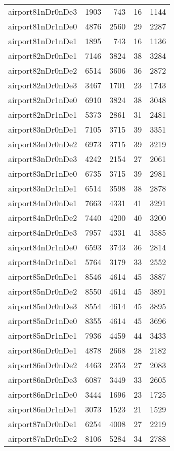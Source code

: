 \begin{longtable}{lrrrr}
airport81nDr0nDe3 & 1903 & 743 & 16 & 1144 \\
airport81nDr1nDe0 & 4876 & 2560 & 29 & 2287 \\
airport81nDr1nDe1 & 1895 & 743 & 16 & 1136 \\
airport82nDr0nDe1 & 7146 & 3824 & 38 & 3284 \\
airport82nDr0nDe2 & 6514 & 3606 & 36 & 2872 \\
airport82nDr0nDe3 & 3467 & 1701 & 23 & 1743 \\
airport82nDr1nDe0 & 6910 & 3824 & 38 & 3048 \\
airport82nDr1nDe1 & 5373 & 2861 & 31 & 2481 \\
airport83nDr0nDe1 & 7105 & 3715 & 39 & 3351 \\
airport83nDr0nDe2 & 6973 & 3715 & 39 & 3219 \\
airport83nDr0nDe3 & 4242 & 2154 & 27 & 2061 \\
airport83nDr1nDe0 & 6735 & 3715 & 39 & 2981 \\
airport83nDr1nDe1 & 6514 & 3598 & 38 & 2878 \\
airport84nDr0nDe1 & 7663 & 4331 & 41 & 3291 \\
airport84nDr0nDe2 & 7440 & 4200 & 40 & 3200 \\
airport84nDr0nDe3 & 7957 & 4331 & 41 & 3585 \\
airport84nDr1nDe0 & 6593 & 3743 & 36 & 2814 \\
airport84nDr1nDe1 & 5764 & 3179 & 33 & 2552 \\
airport85nDr0nDe1 & 8546 & 4614 & 45 & 3887 \\
airport85nDr0nDe2 & 8550 & 4614 & 45 & 3891 \\
airport85nDr0nDe3 & 8554 & 4614 & 45 & 3895 \\
airport85nDr1nDe0 & 8355 & 4614 & 45 & 3696 \\
airport85nDr1nDe1 & 7936 & 4459 & 44 & 3433 \\
airport86nDr0nDe1 & 4878 & 2668 & 28 & 2182 \\
airport86nDr0nDe2 & 4463 & 2353 & 27 & 2083 \\
airport86nDr0nDe3 & 6087 & 3449 & 33 & 2605 \\
airport86nDr1nDe0 & 3444 & 1696 & 23 & 1725 \\
airport86nDr1nDe1 & 3073 & 1523 & 21 & 1529 \\
airport87nDr0nDe1 & 6254 & 4008 & 27 & 2219 \\
airport87nDr0nDe2 & 8106 & 5284 & 34 & 2788 \\

\end{longtable}
